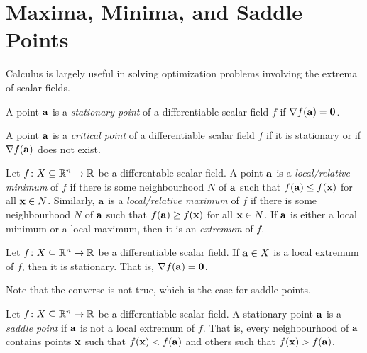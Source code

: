 \documentclass{article}
\begin{document}
\section{Maxima, Minima, and Saddle Points}

Calculus is largely useful in solving optimization problems involving the extrema of scalar fields.

\begin{definition}
  A point $\mathbf{a}$ is a \emph{stationary point} of a differentiable scalar field $f$ if $\nabla f(\mathbf{a}) = \mathbf{0}$.
\end{definition}

\begin{definition}
  A point $\mathbf{a}$ is a \emph{critical point} of a differentiable scalar field $f$ if it is stationary or if $\nabla f(\mathbf{a})$ does not exist.
\end{definition}

\begin{definition}[Extrema]
  Let $f \colon X \subseteq \mathbb{R}^n \to \mathbb{R}$ be a differentable scalar field.
  A point $\mathbf{a}$ is a \emph{local/relative minimum} of $f$ if there is some neighbourhood $N$ of $\mathbf{a}$ such that $f(\mathbf{a}) \leq f(\mathbf{x})$ for all $\mathbf{x} \in N$.
  Similarly, $\mathbf{a}$ is a \emph{local/relative maximum} of $f$ if there is some neighbourhood $N$ of $\mathbf{a}$ such that $f(\mathbf{a}) \geq f(\mathbf{x})$ for all $\mathbf{x} \in N$.
  If $\mathbf{a}$ is either a local minimum or a local maximum, then it is an \emph{extremum} of $f$.
\end{definition}

\begin{theorem}
  Let $f \colon X \subseteq \mathbb{R}^n \to \mathbb{R}$ be a differentiable scalar field.
  If $\mathbf{a} \in X$ is a local extremum of $f$, then it is stationary.
  That is, $\nabla f(\mathbf{a}) = \mathbf{0}$.
\end{theorem}
Note that the converse is not true, which is the case for saddle points.

\begin{definition}
  Let $f \colon X \subseteq \mathbb{R}^n \to \mathbb{R}$ be a differentiable scalar field.
  A stationary point $\mathbf{a}$ is a \emph{saddle point} if $\mathbf{a}$ is not a local extremum of $f$.
  That is, every neighbourhood of $\mathbf{a}$ contains points $\mathbf{x}$ such that $f(\mathbf{x}) < f(\mathbf{a})$ and others such that $f(\mathbf{x}) > f(\mathbf{a})$.
\end{definition}
\end{document}
